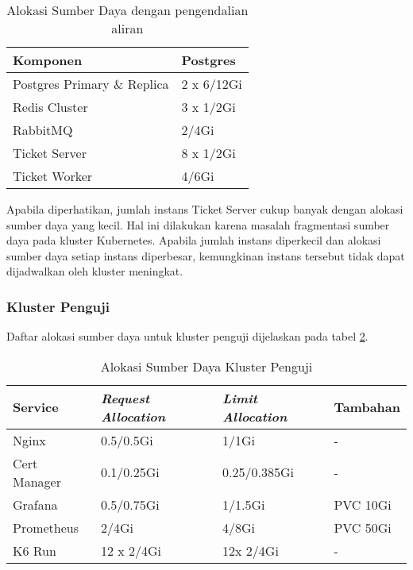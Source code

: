 \begin{table}[htbp]
    \centering
    \caption{Alokasi Sumber Daya dengan pengendalian aliran}
    \label{tab:service_comparison_fc}
    \begin{tabular}{|l|l|}
        \hline
        \textbf{Komponen}           & \textbf{Postgres}     \\ \hline
        Postgres Primary \& Replica & 2 x 6/12Gi            \\ \hline
        Redis Cluster               & 3 x 1/2Gi             \\ \hline
        RabbitMQ                    & 2/4Gi                 \\ \hline
        Ticket Server               & 8 x 1/2Gi             \\ \hline
        Ticket Worker               & 4/6Gi                 \\ \hline
    \end{tabular}
\end{table}

Apabila diperhatikan, jumlah instans Ticket Server cukup banyak dengan alokasi sumber daya yang kecil. Hal ini dilakukan karena masalah fragmentasi sumber daya pada kluster Kubernetes. Apabila jumlah instans diperkecil dan alokasi sumber daya setiap instans diperbesar, kemungkinan instans tersebut tidak dapat dijadwalkan oleh kluster meningkat.

\subsubsection{Kluster Penguji}

Daftar alokasi sumber daya untuk kluster penguji dijelaskan pada tabel \ref{tab:test-cluster-allocation}.

\begin{table}[htbp]
    \centering
    \caption{Alokasi Sumber Daya Kluster Penguji}
    \label{tab:test-cluster-allocation}
    \begin{tabular}{|l|l|l|l|}
        \hline
        \textbf{Service} & \textbf{\textit{Request Allocation}} & \textbf{\textit{Limit Allocation}} & \textbf{Tambahan} \\ \hline
        Nginx            & 0.5/0.5Gi                    & 1/1Gi                      & -              \\ \hline
        Cert Manager     & 0.1/0.25Gi                   & 0.25/0.385Gi               & -              \\ \hline
        Grafana          & 0.5/0.75Gi                   & 1/1.5Gi                    & PVC 10Gi       \\ \hline
        Prometheus       & 2/4Gi                        & 4/8Gi                      & PVC 50Gi       \\ \hline
        K6 Run           & 12 x 2/4Gi                   & 12x 2/4Gi                  & -              \\ \hline
    \end{tabular}
\end{table}

